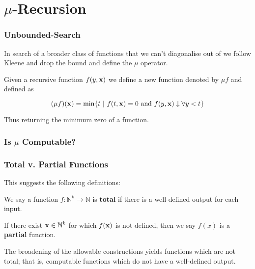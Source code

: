 \documentclass{beamer}
\theoremstyle{indentDefn} \newtheorem{defn}[]{Definition}
\begin{document}
\section{$\mu$-Recursion}

\begin{frame}
	\frametitle{Unbounded-Search}

	In search of a broader class of functions that we can't diagonalise out of we follow Kleene and drop the bound and define the $\mu$ operator. 

	\vspace{0.5cm}

	Given a recursive function $f(y,{\bf x})$ we define a new function denoted by $\mu f$ and defined as

	$$(\mu f)({\bf x}) = \text{min}\{t \ | \ f(t,{\bf x}) = 0 \text{ and } f(y,{\bf x}) \downarrow \forall y < t \} $$

	Thus returning the minimum zero of a function.
\end{frame}

\begin{frame}
	\frametitle{Is $\mu$ Computable?}


\end{frame}

\begin{frame}
	\frametitle{Total v. Partial Functions}

	This suggests the following definitions: 

	\vspace{0.5cm}

	We say a function $f:\mathbb{N}^{k} \rightarrow \mathbb{N}$ is {\bf total} if there is a well-defined output for each input. 

	\vspace{0.5cm}

	If there exist ${\bf x} \in \mathbb{N}^{k}$ for which $f({\bf x})$ is not defined, then we say $f(x)$ is a {\bf partial} function.

	\vspace{0.5cm}

	The broadening of the allowable constructions yields functions which are not total; that is, computable functions which do not have a well-defined output. 


\end{frame}
\end{document}

